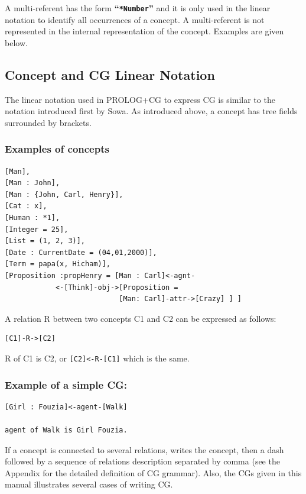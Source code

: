 \documentclass{book}
\begin{document}
A multi-referent has the form {\bf ``\texttt{*Number}''} and it is
only used in the linear notation to identify all occurrences of a
concept. A multi-referent is not represented in the internal
representation of the concept. Examples are given below.

\subsection{Concept and CG Linear Notation}

The linear notation used in PROLOG+CG to express CG is similar to
the notation introduced first by Sowa. As introduced above, a concept
has tree fields surrounded by brackets.

\subsubsection{Examples of concepts}

\begin{verbatim}
[Man], 
[Man : John],
[Man : {John, Carl, Henry}], 
[Cat : x], 
[Human : *1], 
[Integer = 25], 
[List = (1, 2, 3)],
[Date : CurrentDate = (04,01,2000)],
[Term = papa(x, Hicham)],
[Proposition :propHenry = [Man : Carl]<-agnt-
            <-[Think]-obj->[Proposition =
                           [Man: Carl]-attr->[Crazy] ] ]
\end{verbatim}


A relation R between two concepts C1 and C2 can be expressed as
follows:

\begin{verbatim}
[C1]-R->[C2]
\end{verbatim}

R of C1 is C2, or \texttt{[C2]<-R-[C1]} which is the same.

\subsubsection{Example of a simple CG:}


\begin{verbatim}
[Girl : Fouzia]<-agent-[Walk]

agent of Walk is Girl Fouzia.
\end{verbatim}

If a concept is connected to several relations, writes the concept,
then a dash followed by a sequence of relations description separated
by comma (see the Appendix for the detailed
definition of CG grammar). Also, the CGs given in this manual
illustrates several cases of writing CG.
\end{document}
